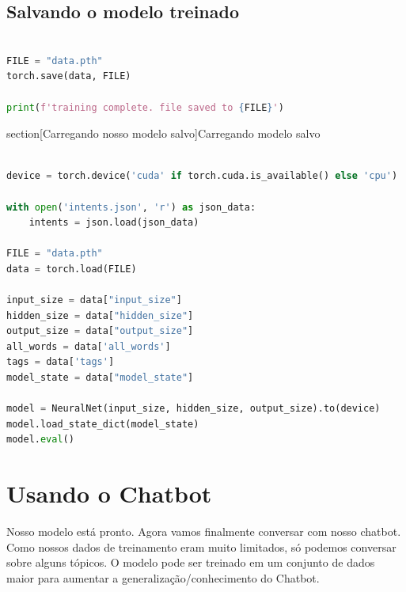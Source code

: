 \subsection[Salvando o modelo treinado]{Salvando o modelo treinado}

\begin{lstlisting}[language=Python, caption=Salvando o modelo treinado]

FILE = "data.pth"
torch.save(data, FILE)

print(f'training complete. file saved to {FILE}')

\end{lstlisting}

section[Carregando nosso modelo salvo]{Carregando modelo salvo}

\begin{lstlisting}[language=Python, caption=Carregando modelo salvo]

device = torch.device('cuda' if torch.cuda.is_available() else 'cpu')

with open('intents.json', 'r') as json_data:
    intents = json.load(json_data)

FILE = "data.pth"
data = torch.load(FILE)

input_size = data["input_size"]
hidden_size = data["hidden_size"]
output_size = data["output_size"]
all_words = data['all_words']
tags = data['tags']
model_state = data["model_state"]

model = NeuralNet(input_size, hidden_size, output_size).to(device)
model.load_state_dict(model_state)
model.eval()

\end{lstlisting}

\section[Usando o Chatbot]{Usando o Chatbot}

Nosso modelo está pronto. Agora vamos finalmente conversar com nosso chatbot. Como nossos dados de treinamento eram muito limitados, só podemos conversar sobre alguns tópicos. O modelo pode ser treinado em um conjunto de dados maior para aumentar a generalização/conhecimento do Chatbot.

